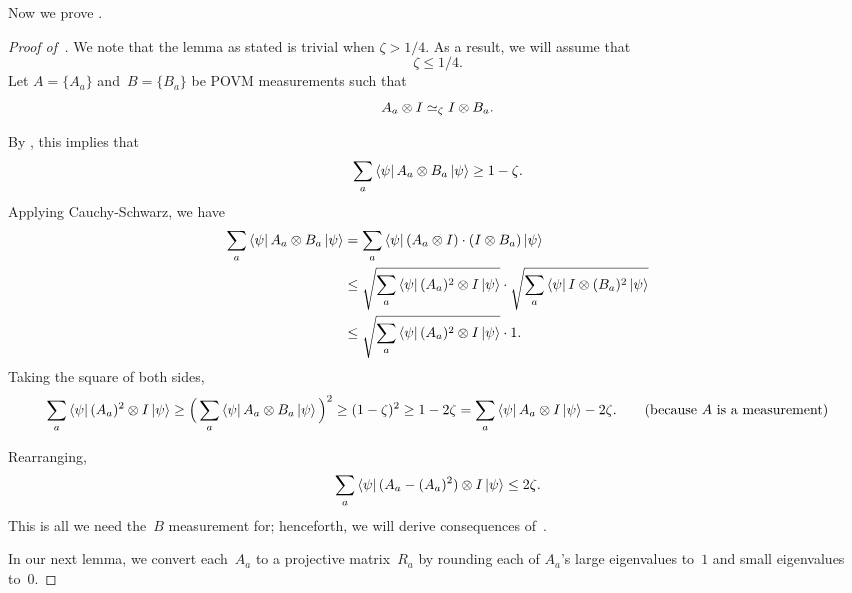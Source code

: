 Now we prove .

\begin{proof}[Proof of~]
We note that the lemma as stated is trivial when $\zeta > 1/4$.
As a result, we will assume that
\begin{equation}\label{eq:assumption-on-zeta}
\zeta \leq 1/4.
\end{equation}
Let $A = \{A_a\}$ and~$B = \{B_a\}$ be POVM measurements such that
\begin{equation*}
A_a \otimes I \simeq_{\zeta} I \otimes B_a.
\end{equation*}

By , this implies that
\begin{equation*}
\sum_a \bra{\psi}A_a \otimes B_a \ket{\psi} \geq 1 - \zeta.
\end{equation*}
Applying Cauchy-Schwarz, we have
\begin{align*}
\sum_a \bra{\psi} A_a \otimes B_a \ket{\psi}
&= \sum_a \bra{\psi} (A_a \otimes I) \cdot (I \otimes B_a) \ket{\psi}\nonumber\\
&\leq \sqrt{\sum_a \bra{\psi} (A_a)^2 \otimes I \ket{\psi}} \cdot \sqrt{\sum_a \bra{\psi} I \otimes (B_a)^2 \ket{\psi}}\nonumber\\
& \leq \sqrt{\sum_a \bra{\psi} (A_a)^2 \otimes I \ket{\psi}} \cdot 1.
\end{align*}
Taking the square of both sides,
\begin{equation*}
\sum_a \bra{\psi} (A_a)^2 \otimes I \ket{\psi} \geq \Big(\sum_a \bra{\psi} A_a \otimes B_a \ket{\psi}\Big)^2 \geq (1-\zeta)^2
\geq 1 - 2\zeta
= \sum_a \bra{\psi} A_a \otimes I \ket{\psi} - 2\zeta. \tag{because~$A$ is a measurement}
\end{equation*}

Rearranging,
\begin{equation}\label{eq:A-looks-projective}
\sum_a \bra{\psi} (A_a - (A_a)^2) \otimes I \ket{\psi}
\leq 2\zeta.
\end{equation}
This is all we need the~$B$ measurement for; henceforth, we will derive consequences of~.

In our next lemma, we convert each~$A_a$ to a projective matrix~$R_a$
by rounding each of $A_a$'s large eigenvalues to~$1$
and small eigenvalues to~$0$.


\end{proof}
